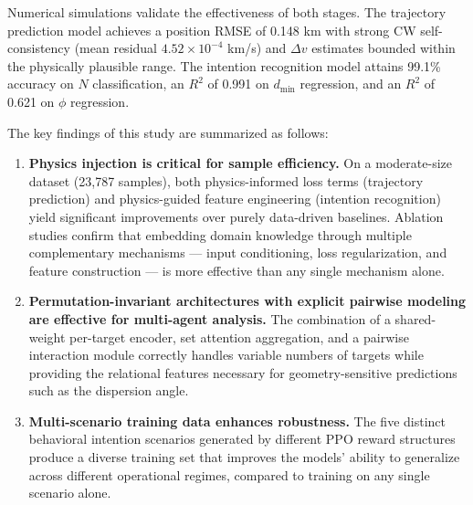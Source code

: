 \documentclass[a4paper,fleqn]{cas-dc}
\begin{document}
Numerical simulations validate the effectiveness of both stages. The trajectory prediction model achieves a position RMSE of 0.148 km with strong CW self-consistency (mean residual $4.52 \times 10^{-4}$ km/s) and $\Delta v$ estimates bounded within the physically plausible range. The intention recognition model attains 99.1\% accuracy on $N$ classification, an $R^2$ of 0.991 on $d_{\min}$ regression, and an $R^2$ of 0.621 on $\phi$ regression.

The key findings of this study are summarized as follows:

\begin{enumerate}
    \item \textbf{Physics injection is critical for sample efficiency.} On a moderate-size dataset (23,787 samples), both physics-informed loss terms (trajectory prediction) and physics-guided feature engineering (intention recognition) yield significant improvements over purely data-driven baselines. Ablation studies confirm that embedding domain knowledge through multiple complementary mechanisms --- input conditioning, loss regularization, and feature construction --- is more effective than any single mechanism alone.

    \item \textbf{Permutation-invariant architectures with explicit pairwise modeling are effective for multi-agent analysis.} The combination of a shared-weight per-target encoder, set attention aggregation, and a pairwise interaction module correctly handles variable numbers of targets while providing the relational features necessary for geometry-sensitive predictions such as the dispersion angle.

    \item \textbf{Multi-scenario training data enhances robustness.} The five distinct behavioral intention scenarios generated by different PPO reward structures produce a diverse training set that improves the models' ability to generalize across different operational regimes, compared to training on any single scenario alone.
\end{enumerate}
\end{document}
